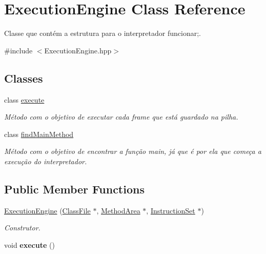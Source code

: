 \hypertarget{classExecutionEngine}{}\section{Execution\+Engine Class Reference}
\label{classExecutionEngine}


Classe que contém a estrutura para o interpretador funcionar;.  




{\ttfamily \#include $<$Execution\+Engine.\+hpp$>$}

\subsection*{Classes}
\begin{DoxyCompactItemize}
\item 
class \hyperlink{classExecutionEngine_1_1execute}{execute}
\begin{DoxyCompactList}\small\item\em Método com o objetivo de executar cada frame que está guardado na pilha. \end{DoxyCompactList}\item 
class \hyperlink{classExecutionEngine_1_1findMainMethod}{find\+Main\+Method}
\begin{DoxyCompactList}\small\item\em Método com o objetivo de encontrar a função main, já que é por ela que começa a execução do interpretador. \end{DoxyCompactList}\end{DoxyCompactItemize}
\subsection*{Public Member Functions}
\begin{DoxyCompactItemize}
\item 
\hyperlink{classExecutionEngine_a001eeecb7503b7c065a1856621331d48}{Execution\+Engine} (\hyperlink{classClassFile}{Class\+File} $\ast$, \hyperlink{classMethodArea}{Method\+Area} $\ast$, \hyperlink{classInstructionSet}{Instruction\+Set} $\ast$)
\begin{DoxyCompactList}\small\item\em Construtor. \end{DoxyCompactList}\item 
void {\bfseries execute} ()\hypertarget{classExecutionEngine_ae94b5187f2d6b92b1ca162b4a040235f}{}\label{classExecutionEngine_ae94b5187f2d6b92b1ca162b4a040235f}

\end{DoxyCompactItemize}


